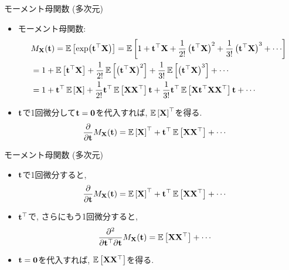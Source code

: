 \documentclass[dvipdfmx,notheorems,t]{beamer}
\begin{document}
\begin{frame}{モーメント母関数 (多次元)}
\begin{itemize}
  \item モーメント母関数:
  \begin{align*}
    & M_{\vb{X}}(\vb{t}) = \E{\exp(\vb{t}^\top \vb{X})} = \E{1 + \vb{t}^\top \vb{X}
      + \frac{1}{2!} \left( \vb{t}^\top \vb{X} \right)^2
      + \frac{1}{3!} \left( \vb{t}^\top \vb{X} \right)^3 + \cdots} \\
    &= 1 + \E{\vb{t}^\top \vb{X}} + \frac{1}{2!} \E{\left( \vb{t}^\top \vb{X} \right)^2}
      + \frac{1}{3!} \E{\left( \vb{t}^\top \vb{X} \right)^3} + \cdots \\
    &= 1 + \vb{t}^\top \E{\vb{X}} + \frac{1}{2!} \vb{t}^\top \E{\vb{X} \vb{X}^\top} \vb{t}
      + \frac{1}{3!} \vb{t}^\top \E{\vb{X} \vb{t}^\top \vb{X} \vb{X}^\top} \vb{t} + \cdots
  \end{align*}
  \item $\vb{t}$で1回微分して$\vb{t} = \vb{0}$を代入すれば, $\operatorname{\mathbb{E}} \left[ \vb{X} \right]^\top$を得る.
  \begin{align*}
    \pdv{\vb{t}} M_{\vb{X}}(\vb{t})
    &= \operatorname{\mathbb{E}} \left[ \vb{X} \right]^\top + \vb{t}^\top \operatorname{\mathbb{E}} \left[ \vb{X} \vb{X}^\top \right] + \cdots
  \end{align*}
\end{itemize}
\end{frame}

\begin{frame}{モーメント母関数 (多次元)}
\begin{itemize}
  \item $\vb{t}$で1回微分すると,
  \begin{align*}
    \pdv{\vb{t}} M_{\vb{X}}(\vb{t})
    &= \operatorname{\mathbb{E}} \left[ \vb{X} \right]^\top + \vb{t}^\top \operatorname{\mathbb{E}} \left[ \vb{X} \vb{X}^\top \right] + \cdots
  \end{align*}
  \item $\vb{t}^\top$で, さらにもう1回微分すると,
  \begin{align*}
    \frac{\partial^2}{\partial \vb{t}^\top \partial \vb{t}} M_{\vb{X}}(\vb{t})
    &= \operatorname{\mathbb{E}} \left[ \vb{X} \vb{X}^\top \right] + \cdots
  \end{align*}
  \item $\vb{t} = \vb{0}$を代入すれば, $\operatorname{\mathbb{E}} \left[ \vb{X} \vb{X}^\top \right]$を得る.
\end{itemize}
\end{frame}
\end{document}

